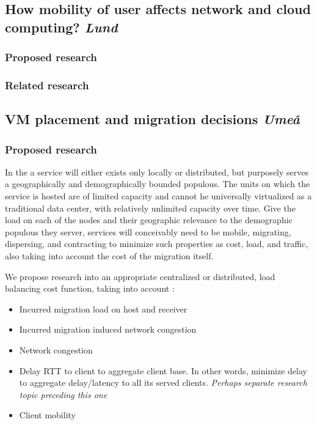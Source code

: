 \subsection{How mobility of user affects network and cloud computing? \emph{Lund}}
\subsubsection{Proposed research}

\subsubsection{Related research}


\subsection{VM placement and migration decisions \emph{Umeå}}
\subsubsection{Proposed research}
In the \xcloud a service will either exists only locally or distributed, but purposely serves a geographically and demographically bounded populous. The units on which the service is hosted are of limited capacity and cannot he universally virtualized as a traditional data center, with relatively unlimited capacity over time. Give the load on each of the nodes and their geographic relevance to the demographic populous they server, services will conceivably need to be mobile, migrating, dispersing, and contracting to minimize such properties as cost, load, and traffic, also taking into account the cost of the migration itself.

We propose research into an appropriate centralized or distributed, load balancing cost function, taking into account :

\begin{itemize}
\item Incurred migration load on host and receiver
\item Incurred migration induced network congestion
\item Network congestion
\item Delay \/ RTT to client to aggregate client base. In other words, minimize delay to aggregate delay/latency to all its served clients. \emph{Perhaps separate research topic preceding this one}
\item Client mobility
\end{itemize}


